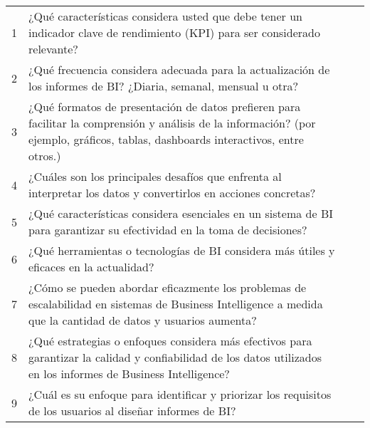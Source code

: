 \begin{longtable}{|l|p{5.9cm}|p{4cm}|p{4cm}|}
    1                                        & ¿Qué características considera usted que debe tener un indicador clave de rendimiento (KPI) para ser considerado relevante?                                                         &                                         &                                           \\
    2                                        & ¿Qué frecuencia considera adecuada para la actualización de los informes de BI? ¿Diaria, semanal, mensual u otra?                                                                   &                                         &                                           \\
    3                                        & ¿Qué formatos de presentación de datos prefieren para facilitar la comprensión y análisis de la información? (por ejemplo, gráficos, tablas, dashboards interactivos, entre otros.) &                                         &                                           \\
    4                                        & ¿Cuáles son los principales desafíos que enfrenta al interpretar los datos y convertirlos en acciones concretas?                                                                    &                                         &                                           \\
    5                                        & ¿Qué características considera esenciales en un sistema de BI para garantizar su efectividad en la toma de decisiones?                                                              &                                         &                                           \\
    6                                        & ¿Qué herramientas o tecnologías de BI considera más útiles y eficaces en la actualidad?                                                                                             &                                         &                                           \\
    7                                        & ¿Cómo se pueden abordar eficazmente los problemas de escalabilidad en sistemas de Business Intelligence a medida que la cantidad de datos y usuarios aumenta?                       &                                         &                                           \\
    8                                        & ¿Qué estrategias o enfoques considera más efectivos para garantizar la calidad y confiabilidad de los datos utilizados en los informes de Business Intelligence?                    &                                         &                                           \\
    9                                        & ¿Cuál es su enfoque para identificar y priorizar los requisitos de los usuarios al diseñar informes de BI?                                                                          &                                         &                                           \\
\end{longtable}
